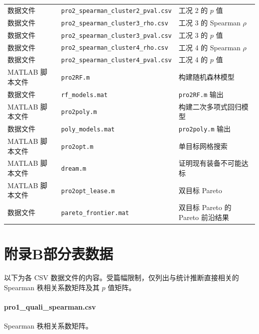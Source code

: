 \begin{table}[htbp]
\begin{tabular}{lll}
数据文件 & \verb|pro2_spearman_cluster2_pval.csv| & 工况 2 的 $p$ 值 \\
数据文件 & \verb|pro2_spearman_cluster3_rho.csv| & 工况 3 的 Spearman $\rho$ \\
数据文件 & \verb|pro2_spearman_cluster3_pval.csv| & 工况 3 的 $p$ 值 \\
数据文件 & \verb|pro2_spearman_cluster4_rho.csv| & 工况 4 的 Spearman $\rho$ \\
数据文件 & \verb|pro2_spearman_cluster4_pval.csv| & 工况 4 的 $p$ 值 \\
MATLAB 脚本文件 & \verb|pro2RF.m| & 构建随机森林模型 \\
数据文件 & \verb|rf_models.mat| & \verb|pro2RF.m| 输出 \\
MATLAB 脚本文件 & \verb|pro2poly.m| & 构建二次多项式回归模型 \\
数据文件 & \verb|poly_models.mat| & \verb|pro2poly.m| 输出 \\
MATLAB 脚本文件 & \verb|pro2opt.m| & 单目标网格搜索 \\
MATLAB 脚本文件 & \verb|dream.m| & 证明现有装备不可能达标 \\
MATLAB 脚本文件 & \verb|pro2opt_lease.m| & 双目标 Pareto \\
数据文件 & \verb|pareto_frontier.mat| & 双目标 Pareto 的 Pareto 前沿结果 \\
\bottomrule
\end{tabular}
\end{table}

\section*{附录B\quad 部分表数据}

以下为各 CSV 数据文件的内容。受篇幅限制，仅列出与统计推断直接相关的 Spearman 秩相关系数矩阵及其 $p$ 值矩阵。

\paragraph{pro1\_quali\_spearman.csv}\quad Spearman 秩相关系数矩阵。

